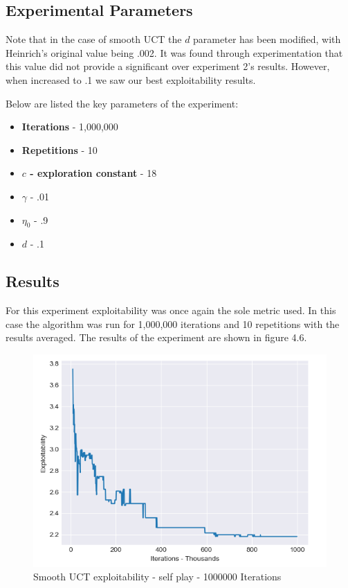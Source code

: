 \subsection{Experimental Parameters}\label{subsec:algAndCoding3}
Note that in the case of smooth UCT the $d$ parameter has been modified, with Heinrich's
original value being .002.
It was found through experimentation that this value did not provide a significant
over experiment 2's results.
However, when increased to .1 we saw our best exploitability results.

Below are listed the key parameters of the experiment:
\begin{itemize}
    \item \textbf{Iterations} - 1,000,000
    \item \textbf{Repetitions} - 10
    \item \textbf{$c$ - exploration constant} - 18
    \item \textbf{$\gamma$} - .01
    \item \textbf{$\eta_0$} - .9
    \item \textbf{$d$} - .1
\end{itemize}

\subsection{Results}\label{subsec:results3}
For this experiment exploitability was once again the sole metric used.
In this case the algorithm was run for 1,000,000 iterations and 10 repetitions with the results averaged.
The results of the experiment are shown in figure 4.6.
\begin{figure}[!ht]
    \includegraphics[scale=.7]{images/exploitability_self-play_stochastic_1000000.png}
    \caption{Smooth UCT exploitability - self play - 1000000 Iterations}
\end{figure}

